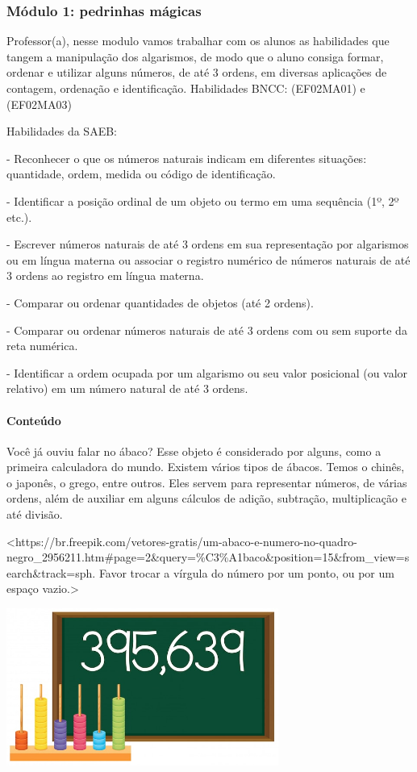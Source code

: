 \subsubsection{Módulo 1: pedrinhas
mágicas}\label{muxf3dulo-1-pedrinhas-muxe1gicas}

Professor(a), nesse modulo vamos trabalhar com os alunos as habilidades
que tangem a manipulação dos algarismos, de modo que o aluno consiga
formar, ordenar e utilizar alguns números, de até 3 ordens, em diversas
aplicações de contagem, ordenação e identificação. Habilidades BNCC:
(EF02MA01) e (EF02MA03)

Habilidades da SAEB:

- Reconhecer o que os números naturais indicam em diferentes situações:
quantidade, ordem, medida ou código de identificação.

- Identificar a posição ordinal de um objeto ou termo em uma sequência
(1º, 2º etc.).

- Escrever números naturais de até 3 ordens em sua representação por
algarismos ou em língua materna ou associar o registro numérico de
números naturais de até 3 ordens ao registro em língua materna.

- Comparar ou ordenar quantidades de objetos (até 2 ordens).

- Comparar ou ordenar números naturais de até 3 ordens com ou sem
suporte da reta numérica.

- Identificar a ordem ocupada por um algarismo ou seu valor posicional
(ou valor relativo) em um número natural de até 3 ordens.

\paragraph{Conteúdo}\label{conteuxfado}

Você já ouviu falar no ábaco? Esse objeto é considerado por alguns, como
a primeira calculadora do mundo. Existem vários tipos de ábacos. Temos o
chinês, o japonês, o grego, entre outros. Eles servem para representar
números, de várias ordens, além de auxiliar em alguns cálculos de
adição, subtração, multiplicação e até divisão.

\textless{}https://br.freepik.com/vetores-gratis/um-abaco-e-numero-no-quadro-negro\_2956211.htm\#page=2\&query=\%C3\%A1baco\&position=15\&from\_view=search\&track=sph.
Favor trocar a vírgula do número por um ponto, ou por um espaço
vazio.\textgreater{}

\includegraphics[width=3.51042in,height=2.03550in]{media/image1.jpeg}

